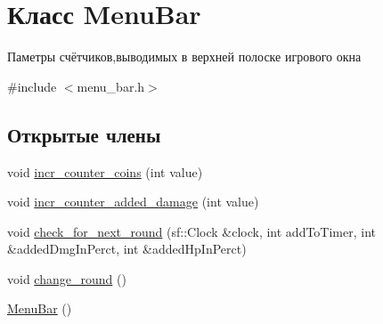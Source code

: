 \hypertarget{classMenuBar}{}\section{Класс Menu\+Bar}
\label{classMenuBar}


Паметры счётчиков,выводимых в верхней полоске игрового окна  




{\ttfamily \#include $<$menu\+\_\+bar.\+h$>$}

\subsection*{Открытые члены}
\begin{DoxyCompactItemize}
\item 
void \hyperlink{classMenuBar_a8517c956a4d36cdacdcb42989b5dccf3}{incr\+\_\+counter\+\_\+coins} (int value)
\item 
void \hyperlink{classMenuBar_a7a4dec33f791733c1babad22ac06d6e3}{incr\+\_\+counter\+\_\+added\+\_\+damage} (int value)
\item 
void \hyperlink{classMenuBar_ab23d3bd560cb6a83deddad9ca2880c5b}{check\+\_\+for\+\_\+next\+\_\+round} (sf\+::\+Clock \&clock, int add\+To\+Timer, int \&added\+Dmg\+In\+Perct, int \&added\+Hp\+In\+Perct)
\item 
void \hyperlink{classMenuBar_a803dd882281e407e0494d2e5c45962bc}{change\+\_\+round} ()
\item 
\hyperlink{classMenuBar_a76a0ec8b0b4cba2775fa71e1791efc6d}{Menu\+Bar} ()
\end{DoxyCompactItemize}

